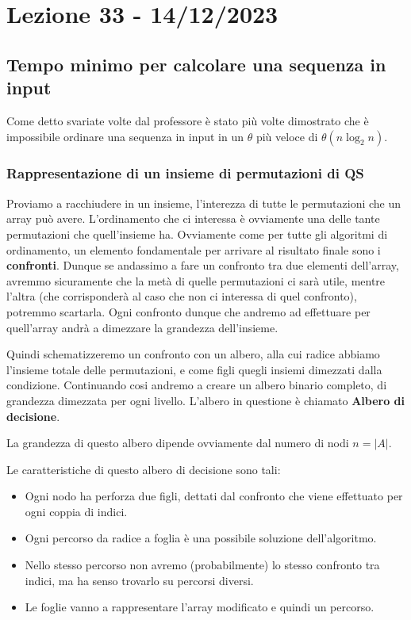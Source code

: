 \section{Lezione 33 - 14/12/2023}
\subsection{Tempo minimo per calcolare una sequenza in input}
Come detto svariate volte dal professore è stato più volte dimostrato che è impossibile ordinare una sequenza in input in un $\theta$ più veloce di $\theta(n\log_2 n)$.

\subsubsection{Rappresentazione di un insieme di permutazioni di QS}
Proviamo a racchiudere in un insieme, l'interezza di tutte le permutazioni che un array può avere. L'ordinamento che ci interessa è ovviamente una delle tante permutazioni che quell'insieme ha. \smallskip
Ovviamente come per tutte gli algoritmi di ordinamento, un elemento fondamentale per arrivare al risultato finale sono i \textbf{confronti}. Dunque se andassimo a fare un confronto tra due elementi dell'array, avremmo sicuramente che la metà di quelle permutazioni ci sarà utile, mentre l'altra (che corrisponderà al caso che non ci interessa di quel confronto), potremmo scartarla. Ogni confronto dunque che andremo ad effettuare per quell'array andrà a dimezzare la grandezza dell'insieme.\smallskip

Quindi schematizzeremo un confronto con un albero, alla cui radice abbiamo l'insieme totale delle permutazioni, e come figli quegli insiemi dimezzati dalla condizione. Continuando cosi andremo a creare un albero binario completo, di grandezza dimezzata per ogni livello. L'albero in questione è chiamato \textbf{Albero di decisione}.\smallskip

La grandezza di questo albero dipende ovviamente dal numero di nodi $n = |A|$.

Le caratteristiche di questo albero di decisione sono tali:
\begin{itemize}
    \item Ogni nodo ha perforza due figli, dettati dal confronto che viene effettuato per ogni coppia di indici.
    \item Ogni percorso da radice a foglia è una possibile soluzione dell'algoritmo.
    \item Nello stesso percorso non avremo (probabilmente) lo stesso confronto tra indici, ma ha senso trovarlo su percorsi diversi.
    \item Le foglie vanno a rappresentare l'array modificato e quindi un percorso.
\end{itemize}\medskip


